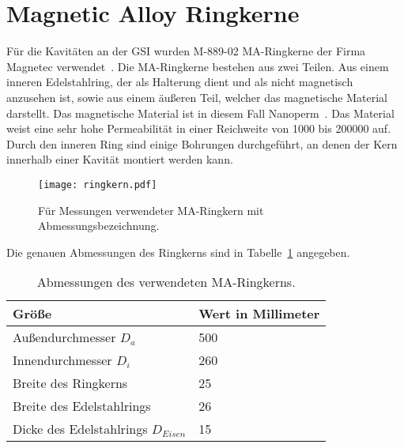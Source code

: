 \section{Magnetic Alloy Ringkerne}
F\"ur die Kavit\"aten an der GSI wurden M-889-02 MA-Ringkerne der Firma Magnetec verwendet~\citep{magnetec2012}. Die MA-Ringkerne bestehen aus zwei Teilen. Aus einem inneren Edelstahlring, der als Halterung dient und als nicht magnetisch anzusehen ist, sowie aus einem \"au\ss{}eren Teil, welcher das magnetische Material darstellt. Das magnetische Material ist in diesem Fall Nanoperm~\citep{magnetec2018}. Das Material weist eine sehr hohe Permeabilit\"at in einer Reichweite von 1000 bis 200000 auf. Durch den inneren Ring sind einige Bohrungen durchgef\"uhrt, an denen der Kern innerhalb einer Kavit\"at montiert werden kann.
\begin{figure}[htb]
	\centering
	\texttt{[image: ringkern.pdf]}
	\caption{F\"ur Messungen verwendeter MA-Ringkern mit Abmessungsbezeichnung.}
	\label{fig:ringkern}
\end{figure}
\par
Die genauen Abmessungen des Ringkerns sind in Tabelle~\ref{tab:ringkern} angegeben.
\begin{table}[htb]
	\centering
	\begin{tabular}{| l | l |}
		\hline
		Gr\"o\ss{}e & Wert in Millimeter \\ \hline
		Au\ss{}endurchmesser $D_a$ & 500 \\
		Innendurchmesser $D_i$ & 260 \\
		Breite des Ringkerns & 25 \\
		Breite des Edelstahlrings & 26 \\
		Dicke des Edelstahlrings $D_{Eisen}$ & 15 \\ \hline
	\end{tabular}
	\caption{Abmessungen des verwendeten MA-Ringkerns.}
	\label{tab:ringkern}
\end{table}
